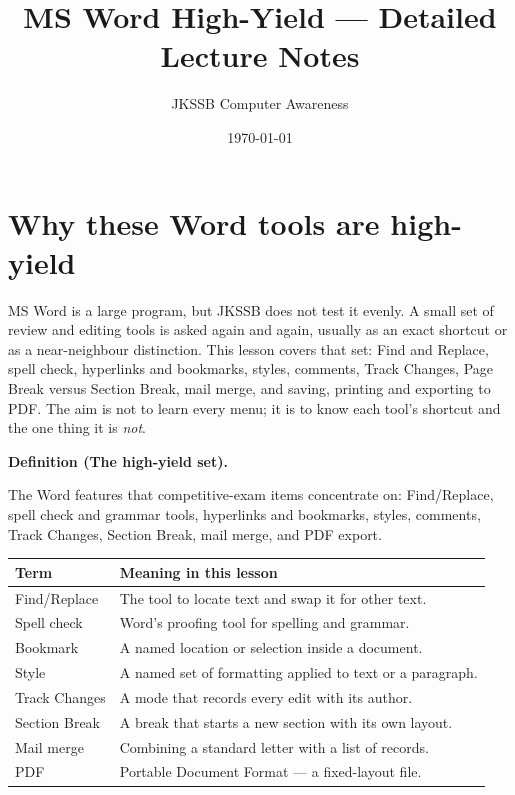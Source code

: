 \documentclass[11pt]{article}
\title{MS Word High-Yield --- Detailed Lecture Notes}
\author{JKSSB Computer Awareness}
\date{\today}
\newenvironment{definitionbox}[1]{%
  \par\noindent\textbf{Definition (#1).}\ \itshape
}{\par\vspace{0.3em}}
\begin{document}
\maketitle

\section{Why these Word tools are high-yield}
MS Word is a large program, but JKSSB does not test it evenly. A small set of
review and editing tools is asked again and again, usually as an exact shortcut
or as a near-neighbour distinction. This lesson covers that set: Find and
Replace, spell check, hyperlinks and bookmarks, styles, comments, Track Changes,
Page Break versus Section Break, mail merge, and saving, printing and exporting
to PDF. The aim is not to learn every menu; it is to know each tool's shortcut
and the one thing it is \emph{not}.

\begin{definitionbox}{The high-yield set}
The Word features that competitive-exam items concentrate on: Find/Replace,
spell check and grammar tools, hyperlinks and bookmarks, styles, comments,
Track Changes, Section Break, mail merge, and PDF export.
\end{definitionbox}

\begin{center}
\begin{tabular}{p{}p{}}
\toprule
\textbf{Term} & \textbf{Meaning in this lesson} \\
\midrule
Find/Replace & The tool to locate text and swap it for other text. \\
Spell check & Word's proofing tool for spelling and grammar. \\
Bookmark & A named location or selection inside a document. \\
Style & A named set of formatting applied to text or a paragraph. \\
Track Changes & A mode that records every edit with its author. \\
Section Break & A break that starts a new section with its own layout. \\
Mail merge & Combining a standard letter with a list of records. \\
PDF & Portable Document Format --- a fixed-layout file. \\
\bottomrule
\end{tabular}
\end{center}
\end{document}
